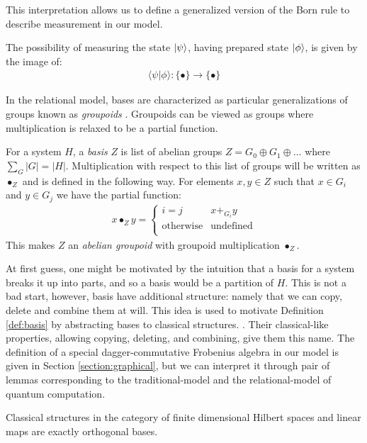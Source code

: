This interpretation allows us to define a generalized version of the Born rule to describe measurement in our model.
\begin{axiom}
The possibility of measuring the state $| \psi \rangle$, having prepared state $| \phi \rangle$, is given by the image of:
\begin{align}
\langle\psi|\phi\rangle:\{\bullet\}\to\{\bullet\}
\end{align}
\end{axiom}

In the relational model, bases are characterized as particular generalizations of groups known as \textit{groupoids} \cite{pavlovic-2009}\cite{evans2009classifying}.  Groupoids can be viewed as groups where multiplication is relaxed to be a partial function.

\begin{defn}
\label{def:basis}
For a system $H$, a \emph{basis} $Z$ is list of abelian groups $Z = G_0\oplus G_1\oplus...$ where $\sum_G |G| = |H|$.
Multiplication with respect to this list of groups will be written as $\bullet_Z$ and is defined in the following way. For elements $x,y\in Z$ such that $x\in G_i$ and $y\in G_j$ we have the partial function:
\begin{align}
\label{eq:groupoid_mult}
x\bullet_Zy = \begin{cases}i=j & x +_{G_i} y \\
\mbox{otherwise} & \mbox{undefined}\\
\end{cases}
\end{align}
\noindent This makes $Z$ an \emph{abelian groupoid} with groupoid multiplication $\bullet_Z$.
\end{defn}

At first guess, one might be motivated by the intuition that a basis for a system breaks it up into parts, and so a basis would be a partition of $H$.  This is not a bad start, however, basis have additional structure: namely that we can copy, delete and combine them at will.  This idea is used to motivate Definition \ref{def:basis} by abstracting bases to classical structures. .
Their classical-like properties, allowing copying, deleting, and combining, give them this name. The definition of a special dagger-commutative Frobenius algebra in our model is given in Section \ref{section:graphical}, but we can interpret it through pair of lemmas corresponding to the traditional-model and the relational-model of quantum computation.
\begin{lemma}
\label{lem:sdfa-hilb}
Classical structures in the category of finite dimensional Hilbert spaces and linear maps are exactly orthogonal bases.
\end{lemma}

